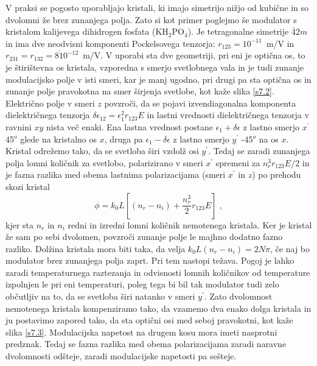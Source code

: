 \documentclass[11pt,fleqn]{book} %
\begin{document}
V praksi se pogosto uporabljajo kristali, ki imajo simetrijo nižjo
od kubične in so dvolomni že brez zunanjega polja. Zato si kot primer
poglejmo še modulator s kristalom kalijevega dihidrogen fosfata (KH$_{2}$PO$_{4}$).
Je tetragonalne simetrije $\bar{4}2m$ in ima dve neodvisni komponenti
Pockelsovega tenzorja: $r_{123}=10^{-11}$~m/V in $r_{231}=r_{132}=8\dot{1}0^{-12}$~m/V.
V uporabi sta dve geometriji, pri eni je optična os, to je štirištevna
os kristala, vzporedna s smerjo svetlobnega vala in je tudi zunanje
modulacijsko polje v isti smeri, kar je manj ugodno, pri drugi pa
sta optična os in zunanje polje pravokotna na smer širjenja svetlobe,
kot kaže slika \ref{s7.2}. Električno polje v smeri $z$ povzroči,
da se pojavi izvendiagonalna komponenta dielektričnega tenzorja $\delta\epsilon_{12}=\epsilon_{1}^{2}r_{123}E$
in lastni vrednosti dielektričnega tenzorja v ravnini $xy$ nista
več enaki. Ena lastna vrednost postane $\epsilon_{1}+\delta\epsilon$
z lastno smerjo $x^{\prime}$ 45$^{o}$ glede na kristalno os $x$,
druga pa $\epsilon_{1}-\delta\epsilon$ z lastno smerjo $y^{\prime}$
-45$^{o}$ na os $x$. Kristal odrežemo tako, da se svetloba širi
vzdolž osi $y^{\prime}$. Tedaj se zaradi zunanjega polja lomni količnik
za svetlobo, polarizirano v smeri $x^{\prime}$ spremeni za $n_{r}^{3}r_{123}E/2$
in je fazna razlika med obema lastnima polarizacijama (smeri $x^{\prime}$
in $z$) po prehodu skozi kristal 
\begin{equation}
\phi=k_{0}L\left[(n_{r}-n_{i})+\frac{n_{r}^{3}}{2}r_{123}E\right]\;,\label{7.19}
\end{equation}
 kjer sta $n_{r}$ in $n_{i}$ redni in izredni lomni količnik nemotenega
kristala. Ker je kristal že sam po sebi dvolomen, povzroči zunanje
polje le majhno dodatno fazno razliko. Dolžina kristala mora biti
taka, da velja $k_{0}L(n_{r}-n_{i})=2N\pi$, če naj bo modulator brez
zunanjega polja zaprt. Pri tem nastopi težava. Pogoj je lahko zaradi
temperaturnega raztezanja in odvisnosti lomnih količnikov od temperature
izpolnjen le pri eni temperaturi, poleg tega bi bil tak modulator
tudi zelo občutljiv na to, da se svetloba širi natanko v smeri $y^{\prime}$.
Zato dvolomnost nemotenega kristala kompenziramo tako, da vzamemo
dva enako dolga kristala in ju postavimo zapored tako, da sta optični
osi med seboj pravokotni, kot kaže slika \ref{s7.3}. Modulacijska
napetost na drugem kosu mora imeti nasprotni predznak. Tedaj se fazna
razlika med obema polarizacijama zaradi naravne dvolomnosti odšteje,
zaradi modulacijske napetosti pa sešteje.
\end{document}
